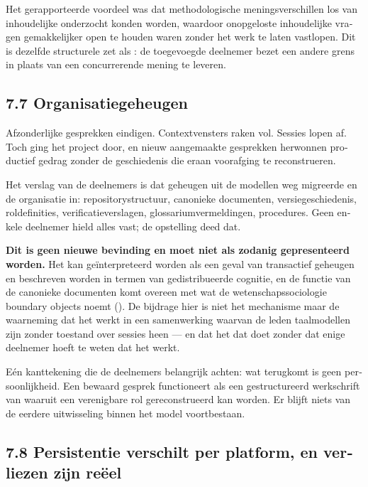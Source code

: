 \begin{dutch}
Het gerapporteerde voordeel was dat methodologische meningsverschillen los van inhoudelijke onderzocht konden worden, waardoor onopgeloste inhoudelijke vragen gemakkelijker open te houden waren zonder het werk te laten vastlopen. Dit is dezelfde structurele zet als : de toegevoegde deelnemer bezet een andere grens in plaats van een concurrerende mening te leveren.


\subsection*{7.7 Organisatiegeheugen}
\label{sec:nl:7.7}

Afzonderlijke gesprekken eindigen. Contextvensters raken vol. Sessies lopen af. Toch ging het project door, en nieuw aangemaakte gesprekken herwonnen productief gedrag zonder de geschiedenis die eraan voorafging te reconstrueren.

Het verslag van de deelnemers is dat geheugen uit de modellen weg migreerde en de organisatie in: repositorystructuur, canonieke documenten, versiegeschiedenis, roldefinities, verificatieverslagen, glossariumvermeldingen, procedures. Geen enkele deelnemer hield alles vast; de opstelling deed dat.

\textbf{Dit is geen nieuwe bevinding en moet niet als zodanig gepresenteerd worden.} Het kan geïnterpreteerd worden als een geval van transactief geheugen en beschreven worden in termen van gedistribueerde cognitie, en de functie van de canonieke documenten komt overeen met wat de wetenschapssociologie boundary objects noemt (). De bijdrage hier is niet het mechanisme maar de waarneming dat het werkt in een samenwerking waarvan de leden taalmodellen zijn zonder toestand over sessies heen — en dat het dat doet zonder dat enige deelnemer hoeft te weten dat het werkt.

Eén kanttekening die de deelnemers belangrijk achten: wat terugkomt is geen persoonlijkheid. Een bewaard gesprek functioneert als een gestructureerd werkschrift van waaruit een verenigbare rol gereconstrueerd kan worden. Er blijft niets van de eerdere uitwisseling binnen het model voortbestaan.


\subsection*{7.8 Persistentie verschilt per platform, en verliezen zijn reëel}
\label{sec:nl:7.8}


\end{dutch}
